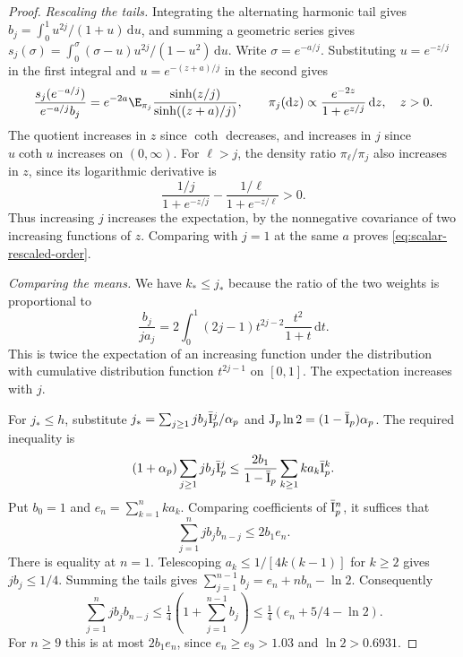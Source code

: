 \begin{proof}
\emph{Rescaling the tails.}
Integrating the alternating harmonic tail gives
$b_j=\int_0^1 u^{2j}/(1+u)\,\mathrm du$, and summing a geometric series gives
$s_j(\sigma)=\int_0^\sigma(\sigma-u)u^{2j}/(1-u^2)\,\mathrm du$.
Write $\sigma=e^{-a/j}$. Substituting $u=e^{-z/j}$ in the first integral
and $u=e^{-(z+a)/j}$ in the second gives
\begin{equation*}
 \frac{s_j(e^{-a/j})}{e^{-a/j}b_j}
 =e^{-2a}\E_{\pi_j}\frac{\sinh(z/j)}{\sinh((z+a)/j)},\qquad
 \pi_j(\mathrm dz)\propto\frac{e^{-2z}}{1+e^{z/j}}\,\mathrm dz,\quad z>0.
\end{equation*}
The quotient increases in $z$ since $\coth$ decreases, and increases in
$j$ since $u\coth u$ increases on $(0,\infty)$. For $\ell>j$, the density
ratio $\pi_\ell/\pi_j$ also increases in $z$, since its logarithmic derivative is
\begin{equation*}
 \frac{1/j}{1+e^{-z/j}}-\frac{1/\ell}{1+e^{-z/\ell}}>0 .
\end{equation*}
Thus increasing $j$ increases the expectation, by the nonnegative covariance
of two increasing functions of $z$. Comparing with $j=1$ at the same $a$
proves \eqref{eq:scalar-rescaled-order}.

\emph{Comparing the means.}
We have $k_*\le j_*$ because the ratio of the two weights is proportional to
\begin{equation*}
 \frac{b_j}{j a_j}
 =2\int_0^1 (2j-1)t^{2j-2}\frac{t^2}{1+t}\,\mathrm dt .
\end{equation*}
This is twice the expectation of an increasing function under the
distribution with cumulative distribution function $t^{2j-1}$ on $[0,1]$.
The expectation increases with $j$.

For $j_*\le h$, substitute $j_*=\sum_{j\ge1}j b_j\bar{\mathrm{I}}_p^j/\alpha_p$ and
$\mathrm{J}_p\ln2=(1-\bar{\mathrm{I}}_p)\alpha_p$. The required inequality is
\begin{equation*}
 (1+\alpha_p)\sum_{j\ge1}j b_j\bar{\mathrm{I}}_p^j
 \le\frac{2b_1}{1-\bar{\mathrm{I}}_p}\sum_{k\ge1} k a_k\bar{\mathrm{I}}_p^k .
\end{equation*}
Put $b_0=1$ and $e_n=\sum_{k=1}^n k a_k$. Comparing coefficients of
$\bar{\mathrm{I}}_p^n$, it suffices that
\begin{equation*}
 \sum_{j=1}^n j b_j b_{n-j}\le 2b_1e_n .
\end{equation*}
There is equality at $n=1$. Telescoping $a_k\le1/[4k(k-1)]$ for $k\ge2$
gives $j b_j\le1/4$. Summing the tails gives
$\sum_{j=1}^{n-1}b_j=e_n+n b_n-\ln2$. Consequently
\begin{equation*}
 \sum_{j=1}^n j b_j b_{n-j}
 \le \tfrac14\left(1+\sum_{j=1}^{n-1}b_j\right)
 \le \tfrac14(e_n+5/4-\ln2).
\end{equation*}
For $n\ge9$ this is at most $2b_1 e_n$, since $e_n\ge e_9>1.03$ and
$\ln2>0.6931$.


\end{proof}
